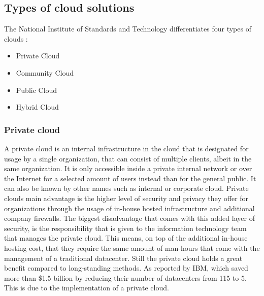 \subsection{Types of cloud solutions}

The National Institute of Standards and Technology differentiates four types of clouds \autocite{Mell2011}:
\begin{itemize}
	\item Private Cloud
	\item Community Cloud
	\item Public Cloud
	\item Hybrid Cloud
\end{itemize}	


\subsubsection{Private cloud}
A private cloud is an internal infrastructure in the cloud that is designated for usage by a single organization, that can consist of multiple clients, albeit in the same organization. It is only accessible inside a private internal network or over the Internet for a selected amount of users instead than for the general public. It can also be known by other names such as internal or corporate cloud. Private clouds main advantage is the higher level of security and privacy they offer for organizations through the usage of in-house hosted infrastructure and additional company firewalls. The biggest disadvantage that comes with this added layer of security, is the responsibility that is given to the information technology team that manages the private cloud. This means, on top of the additional in-house hosting cost, that they require the same amount of man-hours that come with the management of a traditional datacenter. 
Still the private cloud holds a great benefit compared to long-standing methods. As reported by IBM, which saved more than \$1.5 billion by reducing their number of datacenters from 115 to 5. This is due to the implementation of a private cloud. \autocite{Hofmann2010} 


